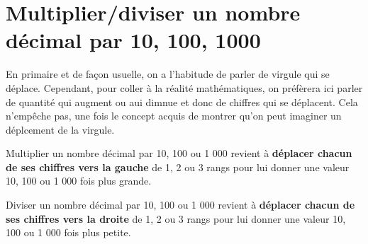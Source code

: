 \section{Multiplier/diviser un nombre décimal par 10, 100, 1000}
\prof
{En primaire et de façon usuelle, on a l'habitude de parler de virgule qui se déplace. Cependant, pour coller à la réalité mathématiques, on préfèrera ici parler de quantité qui augment ou aui dimnue et donc de chiffres qui se déplacent. Cela n'empêche pas, une fois le concept acquis de montrer qu'on peut imaginer un déplcement de la virgule.}

\begin{aconnaitre}

\hspace{2em}\textbullet\hspace{.25em} Multiplier un nombre décimal par 10, 100 ou 1 000 revient à \textbf{\textcolor{C2}{déplacer chacun de ses chiffres vers la gauche}} de 1, 2 ou 3 rangs pour lui donner une valeur 10, 100 ou 1 000 fois plus grande.

\hspace{2em}\textbullet\hspace{.25em} Diviser un nombre décimal par 10, 100 ou 1 000 revient à \textbf{\textcolor{C2}{déplacer chacun de ses chiffres vers la droite}} de 1, 2 ou 3 rangs pour lui donner une valeur 10, 100 ou 1 000 fois plus petite.

\end{aconnaitre}

